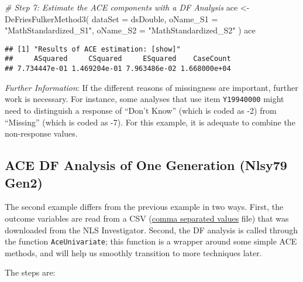 \documentclass[smallextended]{svjour3}       %
\newenvironment{Shaded}{\begin{snugshade}}{\end{snugshade}}
\newcommand{\AttributeTok}[1]{\textcolor[rgb]{0.77,0.63,0.00}{#1}}
\newcommand{\CommentTok}[1]{\textcolor[rgb]{0.56,0.35,0.01}{\textit{#1}}}
\newcommand{\FunctionTok}[1]{\textcolor[rgb]{0.00,0.00,0.00}{#1}}
\newcommand{\NormalTok}[1]{#1}
\newcommand{\OtherTok}[1]{\textcolor[rgb]{0.56,0.35,0.01}{#1}}
\newcommand{\StringTok}[1]{\textcolor[rgb]{0.31,0.60,0.02}{#1}}
\begin{document}
\begin{Shaded}
\begin{Highlighting}[]
\CommentTok{\# Step 7: Estimate the ACE components with a DF Analysis}
\NormalTok{ace }\OtherTok{\textless{}{-}} 
  \FunctionTok{DeFriesFulkerMethod3}\NormalTok{(}
    \AttributeTok{dataSet  =}\NormalTok{ dsDouble,}
    \AttributeTok{oName\_S1 =} \StringTok{"MathStandardized\_S1"}\NormalTok{,}
    \AttributeTok{oName\_S2 =} \StringTok{"MathStandardized\_S2"}
\NormalTok{  )}
\NormalTok{ace}
\end{Highlighting}
\end{Shaded}

\begin{verbatim}
## [1] "Results of ACE estimation: [show]"
##     ASquared     CSquared     ESquared    CaseCount 
## 7.734447e-01 1.469204e-01 7.963486e-02 1.668000e+04
\end{verbatim}

\emph{Further Information}: If the different reasons of missingness are
important, further work is necessary. For instance, some analyses that
use item \texttt{Y19940000} might need to distinguish a response of
``Don't Know'' (which is coded as -2) from ``Missing'' (which is coded
as -7). For this example, it is adequate to combine the non-response
values.

\hypertarget{ace-df-analysis-of-one-generation-nlsy79-gen2}{%
\subsection{ACE DF Analysis of One Generation (Nlsy79
Gen2)}\label{ace-df-analysis-of-one-generation-nlsy79-gen2}}

The second example differs from the previous example in two ways. First,
the outcome variables are read from a CSV
(\href{https://en.wikipedia.org/wiki/Comma-separated_values}{comma
separated values} file) that was downloaded from the NLS Investigator.
Second, the DF analysis is called through the function
\texttt{AceUnivariate}; this function is a wrapper around some simple
ACE methods, and will help us smoothly transition to more techniques
later.

The steps are:
\end{document}
